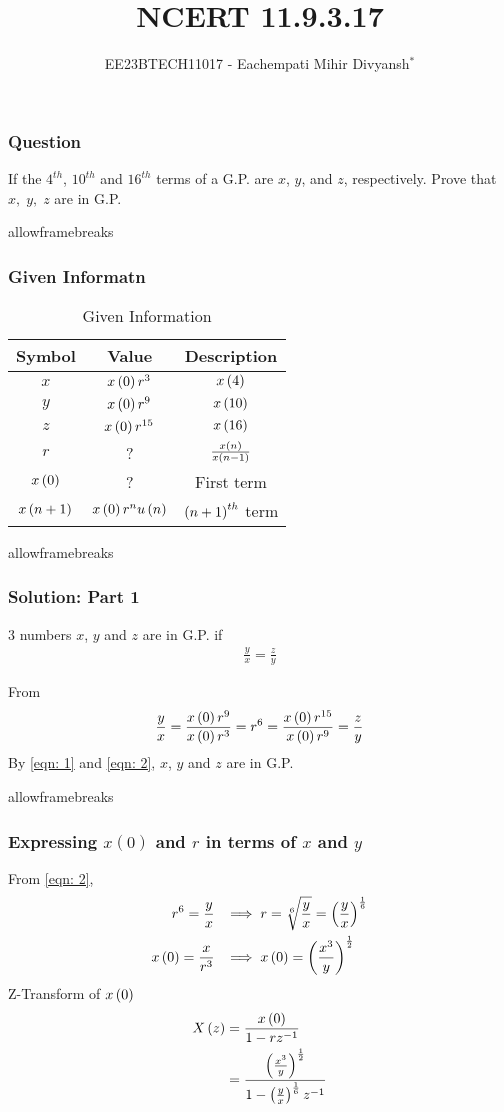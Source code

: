 \documentclass{beamer}
\begin{document}
\title{NCERT 11.9.3.17}
\author{EE23BTECH11017 - Eachempati Mihir Divyansh$^{*}$}
\date{}
\frame{\titlepage}
\begin{frame}   
\frametitle{Question}
If the $4^{th}$, $10^{th}$ and $16^{th}$ terms of a G.P. are $x$, $y$, and $z$, respectively. Prove that $x,\; y,\; z$ are in G.P.
\end{frame}
\begin{frame}{allowframebreaks}
\frametitle{Given Informatn}
\begin{table}
    \centering
    \begin{tabular}{|c|c|c|}
        \hline
            \textbf{Symbol} & \textbf{Value} & \textbf{Description}\\ 
            \hline
                $x$ & $x\left(0\right)r^3$ & $x\left(4\right)$ \\ 
            \hline
                $y$ & $x\left(0\right)r^{9}$ & $x\left(10\right)$\\
            \hline
                $z$ & $x\left(0\right)r^{15}$ & $x\left(16\right)$\\ 
            \hline
                $r$ & ? & $\frac{x\left(n\right)}{x\left(n-1\right)}$\\
            \hline \vspace{0.1cm}
                $x\left(0\right)$ & ? & First term \\
            \hline
                $x\left(n+1\right)$ & $x\left(0\right)r^nu\left(n\right)$ & $\left(n+1\right)^{th}$ term \\
            \hline
        \end{tabular}
        \caption{Given Information}
        \label{tab:1}
    \end{table}
\end{frame}
\begin{frame}{allowframebreaks}
\frametitle{Solution: Part 1}
3 numbers $x$, $y$ and $z$ are in G.P. if 
\begin{align}
\frac{y}{x} = \frac{z}{y} \label{eqn: 1}
\end{align}

From 
\begin{align}
    \frac{y}{x} = \frac{x\left(0\right)r^9}{x\left(0\right)r^3} = r^6 = \frac{x\left(0\right)r^{15}}{x\left(0\right)r^9} = \frac{z}{y}
    \label{eqn: 2}
\end{align}
By \eqref{eqn: 1} and \eqref{eqn: 2}, $x$, $y$ and $z$ are in G.P.
\end{frame}
\begin{frame}{allowframebreaks}
    \frametitle{Expressing $x(0)$ and $r$ in terms of $x$ and $y$}
    From \eqref{eqn: 2}, 
    \begin{align}
        r^6=\frac{y}{x}\;\;
        &\implies r=\sqrt[6]{\frac{y}{x}}=\left(\dfrac{y}{x}\right)^{\frac{1}{6}}\\
        x\left(0\right)=\frac{x}{r^3}\;\;
        &\implies x\left(0\right)=\left(\dfrac{x^3}{y}\right)^{\frac{1}{2}}
    \end{align}
    Z-Transform of $x\left(0\right)$
    \begin{align}
        X\left(z\right)&=\frac{x\left(0\right)}{1-rz^{-1}}\\
        &=\dfrac{\left(\frac{x^3}{y}\right)^{\frac{1}{2}}}{1-\left(\frac{y}{x}\right)^{\frac{1}{6}}z^{-1}}
    \end{align}
\end{frame}
\end{document}
